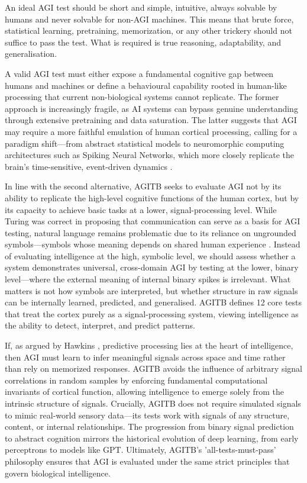 \documentclass{article}
\begin{document}
An ideal AGI test should be short and simple, intuitive, always solvable by humans and never solvable for non-AGI machines. This means that brute force, statistical learning, pretraining, memorization, or any other trickery should not suffice to pass the test. What is required is true reasoning, adaptability, and generalisation.

A valid AGI test must either expose a fundamental cognitive gap between humans and machines or define a behavioural capability rooted in human-like processing that current non-biological systems cannot replicate. The former approach is increasingly fragile, as AI systems can bypass genuine understanding through extensive pretraining and data saturation. The latter suggests that AGI may require a more faithful emulation of human cortical processing, calling for a paradigm shift—from abstract statistical models to neuromorphic computing architectures such as Spiking Neural Networks, which more closely replicate the brain's time-sensitive, event-driven dynamics \cite{Maass1997}.

In line with the second alternative, AGITB seeks to evaluate AGI not by its ability to replicate the high-level cognitive functions of the human cortex, but by its capacity to achieve basic tasks at a lower, signal-processing level. While Turing was correct in proposing that communication can serve as a basis for AGI testing, natural language remains problematic due to its reliance on ungrounded symbols—symbols whose meaning depends on shared human experience \cite{Harnad1990}. Instead of evaluating intelligence at the high, symbolic level, we should assess whether a system demonstrates universal, cross-domain AGI by testing at the lower, binary level—where the external meaning of internal binary spikes is irrelevant. What matters is not how symbols are interpreted, but whether structure in raw signals can be internally learned, predicted, and generalised. AGITB defines 12 core tests that treat the cortex purely as a signal-processing system, viewing intelligence as the ability to detect, interpret, and predict patterns. 

If, as argued by Hawkins \cite{Hawkins2004}, predictive processing lies at the heart of intelligence, then AGI must learn to infer meaningful signals across space and time rather than rely on memorized responses. AGITB avoids the influence of arbitrary signal correlations in random samples by enforcing fundamental computational invariants of cortical function, allowing intelligence to emerge solely from the intrinsic structure of signals. Crucially, AGITB does not require simulated signals to mimic real-world sensory data—its tests work with signals of any structure, content, or internal relationships. The progression from binary signal prediction to abstract cognition mirrors the historical evolution of deep learning, from early perceptrons to models like GPT. Ultimately, AGITB's 'all-tests-must-pass' philosophy ensures that AGI is evaluated under the same strict principles that govern biological intelligence.
\end{document}
